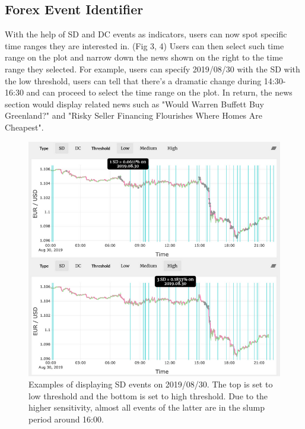 \documentclass[sigconf]{acmart}
\begin{document}
\subsection{Forex Event Identifier}
With the help of SD and DC events as indicators, users can now spot specific time ranges they are interested in. (Fig 3, 4) Users can then select such time range on the plot and narrow down the news shown on the right to the time range they selected. For example, users can specify 2019/08/30 with the SD with the low threshold, users can tell that there’s a dramatic change during 14:30-16:30 and can proceed to select the time range on the plot. In return, the news section would display related news such as "Would Warren Buffett Buy Greenland?" and "Risky Seller Financing Flourishes Where Homes Are Cheapest". 

\begin{figure}[h]
  \centering
  \includegraphics[width=\linewidth]{sd.png}
  \caption{Examples of displaying SD events on 2019/08/30. The top is set to low threshold and the bottom is set to high threshold. Due to the higher sensitivity, almost all events of the latter are in the slump period around 16:00.}
  \Description{}
\end{figure}
\end{document}
